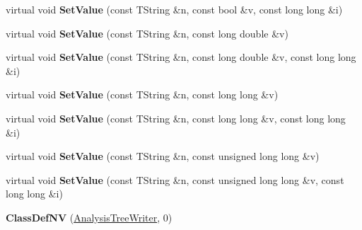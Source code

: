 \begin{DoxyCompactItemize}
\item 
\hypertarget{class_h_a_l_1_1_analysis_tree_writer_a85b8b7790bb9392ed1d865daab3248d7}{virtual void {\bfseries Set\+Value} (const T\+String \&n, const bool \&v, const long long \&i)}\label{class_h_a_l_1_1_analysis_tree_writer_a85b8b7790bb9392ed1d865daab3248d7}

\item 
\hypertarget{class_h_a_l_1_1_analysis_tree_writer_a2e68fdea10ca87aebab5332c2b680286}{virtual void {\bfseries Set\+Value} (const T\+String \&n, const long double \&v)}\label{class_h_a_l_1_1_analysis_tree_writer_a2e68fdea10ca87aebab5332c2b680286}

\item 
\hypertarget{class_h_a_l_1_1_analysis_tree_writer_ae4fbd939b2edfc2c3859ca24f635a475}{virtual void {\bfseries Set\+Value} (const T\+String \&n, const long double \&v, const long long \&i)}\label{class_h_a_l_1_1_analysis_tree_writer_ae4fbd939b2edfc2c3859ca24f635a475}

\item 
\hypertarget{class_h_a_l_1_1_analysis_tree_writer_a73bed978557c7222f4c88b71c1b74424}{virtual void {\bfseries Set\+Value} (const T\+String \&n, const long long \&v)}\label{class_h_a_l_1_1_analysis_tree_writer_a73bed978557c7222f4c88b71c1b74424}

\item 
\hypertarget{class_h_a_l_1_1_analysis_tree_writer_abc1b0d49980dfe48e99cf3c03f271bb3}{virtual void {\bfseries Set\+Value} (const T\+String \&n, const long long \&v, const long long \&i)}\label{class_h_a_l_1_1_analysis_tree_writer_abc1b0d49980dfe48e99cf3c03f271bb3}

\item 
\hypertarget{class_h_a_l_1_1_analysis_tree_writer_ad7fc39378d544f275cbb19145def8fbf}{virtual void {\bfseries Set\+Value} (const T\+String \&n, const unsigned long long \&v)}\label{class_h_a_l_1_1_analysis_tree_writer_ad7fc39378d544f275cbb19145def8fbf}

\item 
\hypertarget{class_h_a_l_1_1_analysis_tree_writer_ae71437812731ea60b3375c771ff912e1}{virtual void {\bfseries Set\+Value} (const T\+String \&n, const unsigned long long \&v, const long long \&i)}\label{class_h_a_l_1_1_analysis_tree_writer_ae71437812731ea60b3375c771ff912e1}

\item 
\hypertarget{class_h_a_l_1_1_analysis_tree_writer_a77da0342b01b89846c418b825d3a9d99}{{\bfseries Class\+Def\+N\+V} (\hyperlink{class_h_a_l_1_1_analysis_tree_writer}{Analysis\+Tree\+Writer}, 0)}\label{class_h_a_l_1_1_analysis_tree_writer_a77da0342b01b89846c418b825d3a9d99}

\end{DoxyCompactItemize}
